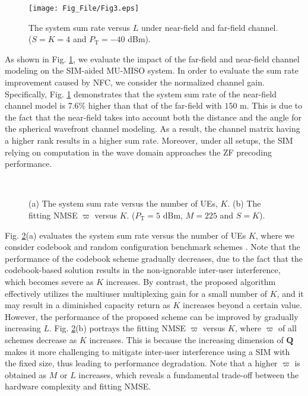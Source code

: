 \documentclass[conference]{IEEEtran}
\theoremstyle{remark}
\begin{document}
\begin{figure}[!t]
\centering
\texttt{[image: Fig\_File/Fig3.eps]}
\caption{The system sum rate versus $L$ under near-field and far-field channel. ($S=K=4$ and $P_\text{T}= -40$ dBm).}
\label{fig_3}
\end{figure}
As shown in Fig. \ref{fig_3}, we evaluate the impact of the far-field \cite{Group_Jia} and near-field channel modeling on the SIM-aided MU-MISO system. 
In order to evaluate the sum rate improvement caused by NFC, we consider the normalized channel gain.
Specifically, Fig. \ref{fig_3} demonstrates that the system sum rate of the near-field channel model is $7.6$\% higher than that of the far-field with $150$ m.
 This is due to the fact that the near-field takes into account both the distance and the angle for the spherical wavefront channel modeling.
As a result, the channel matrix having a higher rank results in a higher sum rate.
Moreover, under all setups, the SIM relying on computation in the wave domain approaches the ZF precoding performance.

\begin{figure}[!t]
\centering
{}\\
\caption{ (a) The system sum rate versus the number of UEs, $K$. (b) The fitting NMSE ${\varpi }$ versus $K$. ($P_\text{T}= 5$ dBm, $M=225$ and $S=K$).}
\label{fig_7}
\end{figure}
Fig. \ref{fig_7}(a) evaluates the system sum rate versus the number of UEs $K$, where we consider codebook and random configuration benchmark schemes \cite{Group_An_SIM_MU_TWC}. 
Note that the performance of the codebook scheme gradually decreases, due to the fact that the codebook-based solution results in the non-ignorable inter-user interference, which becomes severe as $K$ increases.
By contrast, the proposed algorithm effectively utilizes the multiuser multiplexing gain for a small number of $K$, and it may result in a diminished capacity return as $K$ increases beyond a certain value. However, the performance of the proposed scheme can be improved by gradually increasing $L$. 
Fig. \ref{fig_7}(b) portrays the fitting NMSE ${\varpi }$ versus $K$, where ${\varpi }$ of all schemes decrease as $K$ increases. This is because the increasing dimension of $\mathbf{Q}$ makes it more challenging to mitigate inter-user interference using a SIM with the fixed size, thus leading to performance degradation. Note that a higher ${\varpi}$ is obtained as $M$ or $L$ increases, which reveals a fundamental trade-off between the hardware complexity and fitting NMSE.
\end{document}

